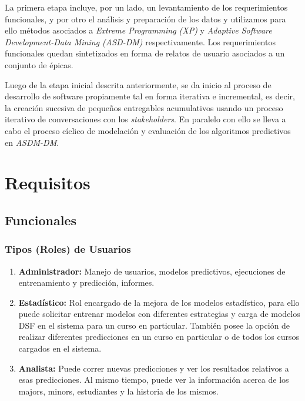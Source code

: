 La primera etapa incluye, por un lado, un levantamiento de los requerimientos funcionales, y por otro el análisis y preparación de los datos y utilizamos para ello métodos asociados a \textit{Extreme Programming (XP)} y \textit{Adaptive Software Development-Data Mining (ASD-DM)} respectivamente.   Los requerimientos funcionales quedan sintetizados en forma de relatos de usuario asociados a un conjunto de épicas.

Luego de la etapa inicial descrita anteriormente, se da inicio al proceso de desarrollo de software propiamente tal en forma iterativa e incremental, es decir, la creación sucesiva de pequeños entregables acumulativos usando un proceso iterativo de conversaciones con los \textit{stakeholders}. En paralelo con ello se lleva a cabo el proceso cíclico de modelación y evaluación de los algoritmos predictivos en \textit{ASDM-DM}.

\section{Requisitos \label{sec:requirements}}
\subsection{Funcionales \label{sec:functional_requirements}}

\subsubsection{Tipos (Roles) de Usuarios \label{sec:user_roles}}

\begin{enumerate}
	\item \textbf{Administrador:} Manejo de usuarios, modelos predictivos, ejecuciones de entrenamiento y predicción, informes.
	\item \textbf{Estadístico:} Rol encargado de la mejora de los modelos estadístico, para ello puede solicitar entrenar modelos con diferentes estrategias y carga de modelos DSF en el sistema para un curso en particular. También posee la opción de realizar diferentes predicciones en un curso en particular o de todos los cursos cargados en el sistema.
	\item \textbf{Analista:} Puede correr nuevas predicciones y ver los resultados relativos a esas predicciones. Al mismo tiempo, puede ver la información acerca de los majors, minors, estudiantes y la historia de los mismos.
\end{enumerate}


